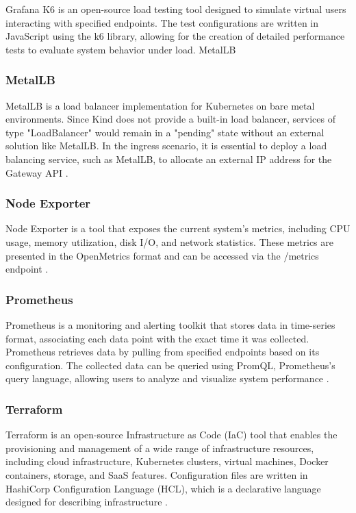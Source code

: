 Grafana K6 is an open-source load testing tool designed to simulate virtual users interacting with specified endpoints. The test configurations are written in JavaScript using the k6 library, allowing for the creation of detailed performance tests to evaluate system behavior under load.
MetalLB

\subsubsection{MetalLB}
\label{sec:metallb}

MetalLB is a load balancer implementation for Kubernetes on bare metal environments. Since Kind does not provide a built-in load balancer, services of type "LoadBalancer" would remain in a "pending" state without an external solution like MetalLB. In the ingress scenario, it is essential to deploy a load balancing service, such as MetalLB, to allocate an external IP address for the Gateway API \cite{MetalLB}.

\subsubsection{Node Exporter}
\label{sec:nodeExporter}

Node Exporter is a tool that exposes the current system's metrics, including CPU usage, memory utilization, disk I/O, and network statistics. These metrics are presented in the OpenMetrics format and can be accessed via the /metrics endpoint \cite{NodeExporter}.

\subsubsection{Prometheus}
\label{sec:prometheus}

Prometheus is a monitoring and alerting toolkit that stores data in time-series format, associating each data point with the exact time it was collected. Prometheus retrieves data by pulling from specified endpoints based on its configuration. The collected data can be queried using PromQL, Prometheus's query language, allowing users to analyze and visualize system performance \cite{Prometheus}.

\subsubsection{Terraform}
\label{sec:terraform}

Terraform is an open-source Infrastructure as Code (IaC) tool that enables the provisioning and management of a wide range of infrastructure resources, including cloud infrastructure, Kubernetes clusters, virtual machines, Docker containers, storage, and SaaS features. Configuration files are written in HashiCorp Configuration Language (HCL), which is a declarative language designed for describing infrastructure \cite{Terraform}.

